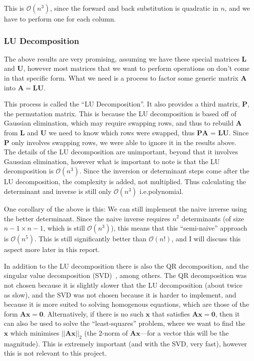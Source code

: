 \documentclass[12pt]{article}
\begin{document}
This is $\mathcal{O}(n^3)$, since the forward and back substitution is quadratic in $n$, and we have to perform one for each column.

\subsubsection{LU Decomposition}
The above results are very promising, assuming we have these special matrices $\mathbf{L}$ and $\mathbf{U}$, however most matrices that we want to perform operations on don't come in that specific form. What we need is a process to factor some generic matrix $\mathbf{A}$ into $\mathbf{A}=\mathbf{LU}$.

This process is called the ``LU Decomposition''\cite{lu_decomposition}. It also provides a third matrix, $\mathbf{P}$, the permutation matrix. This is because the LU decomposition is based off of Gaussian elimination, which may require swapping rows, and thus to rebuild $\mathbf{A}$ from $\mathbf{L}$ and $\mathbf{U}$ we need to know which rows were swapped, thus $\mathbf{PA}$ = $\mathbf{LU}$. Since $\mathbf{P}$ only involves swapping rows, we were able to ignore it in the results above. The details of the LU decomposition are unimportant, beyond that it involves Gaussian elimination, however what is important to note is that the LU decomposition is $\mathcal{O}(n^3)$. Since the inversion or determinant steps come after the LU decomposition, the complexity is added, not multiplied. Thus calculating the determinant and inverse is still only $\mathcal{O}(n^3)$ i.e.\@ polynomial.

One corollary of the above is this: We can still implement the naive inverse using the better determinant. Since the naive inverse requires $n^2$ determinants (of size $n-1 \times n-1$, which is still $\mathcal{O}(n^3)$), this means that this ``semi-naive'' approach is $\mathcal{O}(n^5)$. This is still significantly better than $\mathcal{O}(n!)$, and I will discuss this aspect more later in this report.

In addition to the LU decomposition there is also the QR decomposition, and the singular value decomposition (SVD)~\cite{num_lin_alg}, among others. The QR decomposition was not chosen because it is slightly slower that the LU decomposition (about twice as slow), and the SVD was not chosen because it is harder to implement, and because it is more suited to solving homogenous equations, which are those of the form $\mathbf{A}\mathbf{x}=\mathbf{0}$. Alternatively, if there is no such $\mathbf{x}$ that satisfies $\mathbf{A}\mathbf{x}=\mathbf{0}$, then it can also be used to solve the ``least-squares'' problem, where we want to find the $\mathbf{x}$ which minimises $||\mathbf{Ax}||_2$ (the 2-norm of $\mathbf{Ax}$---for a vector this will be the magnitude). This is extremely important (and with the SVD, very fast), however this is not relevant to this project.
\end{document}
